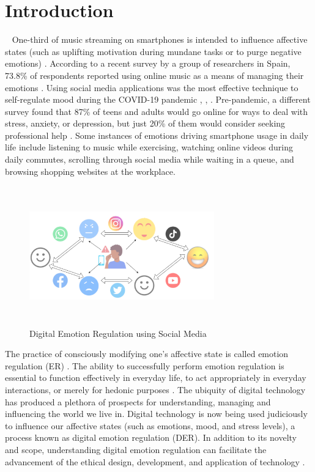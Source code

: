 \section{Introduction}~\label{sec:introduction}
{O}{ne}-third of music streaming on smartphones is intended to influence affective states (such as uplifting motivation during mundane tasks or to purge negative emotions) \cite{wadley2019use}. According to a recent survey by a group of researchers in Spain, 73.8\% of respondents reported using online music as a means of managing their emotions \cite{martin2021music}. Using social media applications was the most effective technique to self-regulate mood during the COVID-19 pandemic \cite{prikhidko2020effect}, \cite{shao2021social}, \cite{colasante2020any}. Pre-pandemic, a different survey found that 87\% of teens and adults would go online for ways to deal with stress, anxiety, or depression, but just 20\% of them would consider seeking professional help \cite{rideout2018digital}. Some instances of emotions driving smartphone usage in daily life include listening to music while exercising, watching online videos during daily commutes, scrolling through social media while waiting in a queue, and browsing shopping websites at the workplace.
    
\begin{figure}[h]
  
    \centering
    \includegraphics[width=8cm,height=6cm,keepaspectratio]{DER.pdf}
  \caption{Digital Emotion Regulation using Social Media}
  \label{fig:SMER}
  \end{figure}
The practice of consciously modifying one's affective state is called emotion regulation (ER) \cite{gross1998emerging}. The ability to successfully perform emotion regulation is essential to function effectively in everyday life, to act appropriately in everyday interactions, or merely for hedonic purposes \cite{webb2012dealing}. The ubiquity of digital technology has produced a plethora of prospects for understanding, managing and influencing the world we live in. Digital technology is now being used judiciously to influence our affective states (such as emotions, mood, and stress levels), a process known as digital emotion regulation (DER). In addition to its novelty and scope, understanding digital emotion regulation can facilitate the advancement of the ethical design, development, and application of technology \cite{wadley2020digital}.


